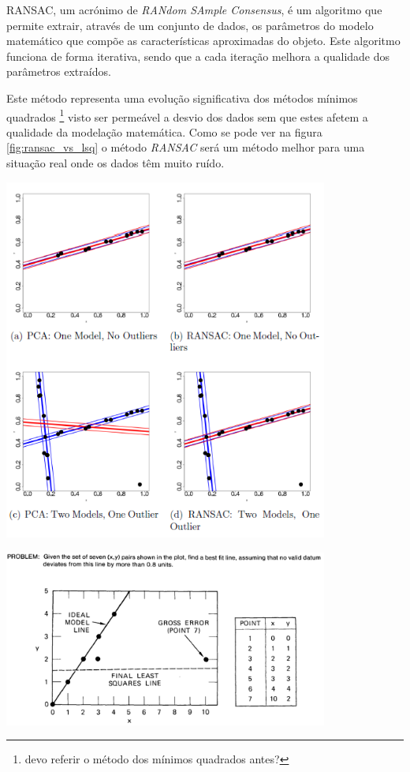 RANSAC\cite{Fischler:1981:RSC:358669.358692}, um acrónimo de \emph{RANdom SAmple Consensus}, é um algoritmo que permite extrair, através de um conjunto de dados, os parâmetros do modelo matemático que compõe as características aproximadas do objeto. Este algoritmo funciona de forma iterativa, sendo que a cada iteração melhora a qualidade dos parâmetros extraídos.

Este método representa uma evolução significativa dos métodos mínimos quadrados \footnote{devo referir o método dos mínimos quadrados antes?} visto ser permeável a desvio dos dados sem que estes afetem a qualidade da modelação matemática.
Como se pode ver na figura \ref{fig:ransac_vs_lsq} o método \emph{RANSAC} será um método melhor para uma situação real onde os dados têm muito ruído.


\begin{center}
	\includegraphics[width=0.80\textwidth]{figures/least_squares_vs_ransac.png}
	\label{fig:ransac_vs_lsq}
\end{center}



\begin{center}
	\includegraphics[width=0.80\textwidth]{figures/least_squares_shortcomings.png}
	\label{fig:ransac}
\end{center}


